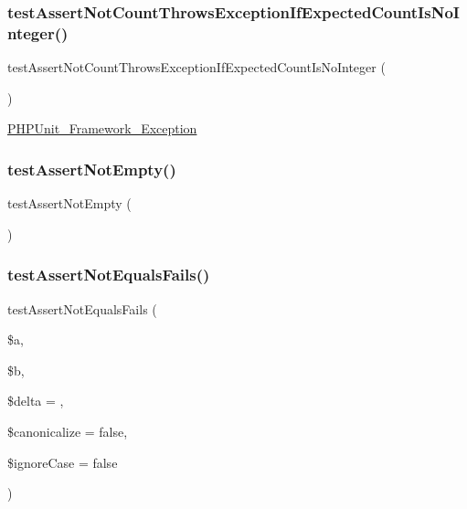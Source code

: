 \subsubsection{\texorpdfstring{test\+Assert\+Not\+Count\+Throws\+Exception\+If\+Expected\+Count\+Is\+No\+Integer()}{testAssertNotCountThrowsExceptionIfExpectedCountIsNoInteger()}}
{\footnotesize\ttfamily test\+Assert\+Not\+Count\+Throws\+Exception\+If\+Expected\+Count\+Is\+No\+Integer (\begin{DoxyParamCaption}{ }\end{DoxyParamCaption})}

\mbox{\hyperlink{class_p_h_p_unit___framework___exception}{P\+H\+P\+Unit\+\_\+\+Framework\+\_\+\+Exception}} \mbox{\label{class_framework___assert_test_ac14ac3a143df96f3109cffef3b4822b9}} 
\subsubsection{\texorpdfstring{test\+Assert\+Not\+Empty()}{testAssertNotEmpty()}}
{\footnotesize\ttfamily test\+Assert\+Not\+Empty (\begin{DoxyParamCaption}{ }\end{DoxyParamCaption})}

\mbox{\label{class_framework___assert_test_ac1e610782c9e5d7ab2115c4d7052727d}} 
\subsubsection{\texorpdfstring{test\+Assert\+Not\+Equals\+Fails()}{testAssertNotEqualsFails()}}
{\footnotesize\ttfamily test\+Assert\+Not\+Equals\+Fails (\begin{DoxyParamCaption}\item[{}]{\$a,  }\item[{}]{\$b,  }\item[{}]{\$delta = {},  }\item[{}]{\$canonicalize = {\ttfamily false},  }\item[{}]{\$ignore\+Case = {\ttfamily false} }\end{DoxyParamCaption})}


